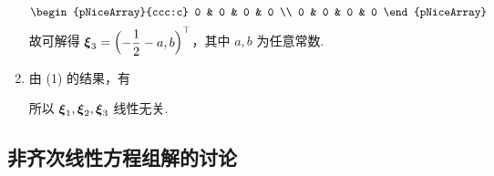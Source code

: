 \begin{solution}
\begin{enumerate}[label=(\arabic{*})]
$$\begin{pNiceArray}{ccc:c}
                      0 & 0 & 0 & 0             \\
                      0 & 0 & 0 & 0
                  \end{pNiceArray}$$
              故可解得 $\vb*{\xi}_3=\mqty(-\dfrac{1}{2}-a,b)^\top$，其中 $a,b$ 为任意常数.
        \item 由 (1) 的结果，有
              所以 $\vb*{\xi}_1,\vb*{\xi}_2,\vb*{\xi}_3$ 线性无关.
    \end{enumerate}
\end{solution}

\subsection{非齐次线性方程组解的讨论}

